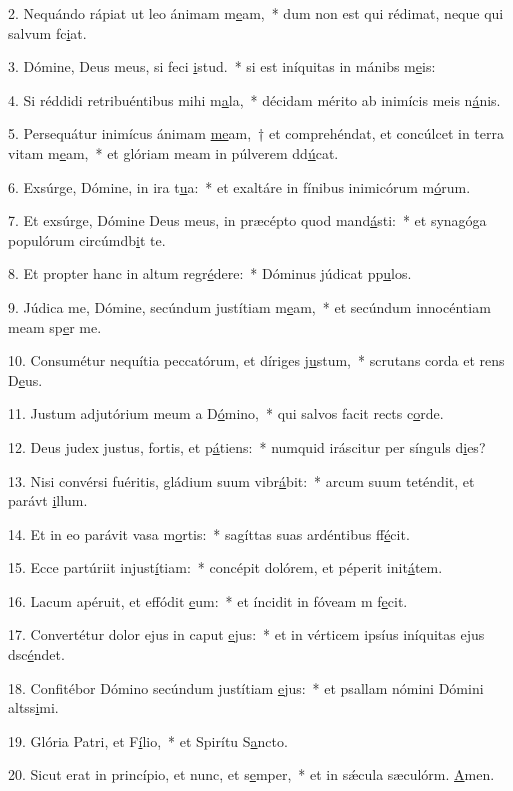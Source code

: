 2. Nequándo rápiat ut leo ánimam m\uline{e}am,~* dum non est qui rédimat, neque qui salvum fc\uline{i}at.\par 
3. Dómine, Deus meus, si feci \uline{i}stud.~* si est iníquitas in mánibs m\uline{e}is:\par 
4. Si réddidi retribuéntibus mihi m\uline{a}la,~* décidam mérito ab inimícis meis n\uline{á}nis.\par 
5. Persequátur inimícus ánimam \uline{me}am,~† et comprehéndat, et concúlcet in terra vitam m\uline{e}am,~* et glóriam meam in púlverem dd\uline{ú}cat.\par 
6. Exsúrge, Dómine, in ira t\uline{u}a:~* et exaltáre in fínibus inimicórum m\uline{ó}rum.\par 
7. Et exsúrge, Dómine Deus meus, in præcépto quod mand\uline{á}sti:~* et synagóga populórum circúmdb\uline{i}t te.\par 
8. Et propter hanc in altum regr\uline{é}dere:~* Dóminus júdicat pp\uline{u}los.\par 
9. Júdica me, Dómine, secúndum justítiam m\uline{e}am,~* et secúndum innocéntiam meam sp\uline{e}r me.\par 
10. Consumétur nequítia peccatórum, et díriges j\uline{u}stum,~* scrutans corda et rens D\uline{e}us.\par 
11. Justum adjutórium meum a D\uline{ó}mino,~* qui salvos facit rects c\uline{o}rde.\par 
12. Deus judex justus, fortis, et p\uline{á}tiens:~* numquid iráscitur per sínguls d\uline{i}es?\par 
13. Nisi convérsi fuéritis, gládium suum vibr\uline{á}bit:~* arcum suum teténdit, et parávt \uline{i}llum.\par 
14. Et in eo parávit vasa m\uline{o}rtis:~* sagíttas suas ardéntibus ff\uline{é}cit.\par 
15. Ecce partúriit injust\uline{í}tiam:~* concépit dolórem, et péperit init\uline{á}tem.\par 
16. Lacum apéruit, et effódit \uline{e}um:~* et íncidit in fóveam m f\uline{e}cit.\par 
17. Convertétur dolor ejus in caput \uline{e}jus:~* et in vérticem ipsíus iníquitas ejus dsc\uline{é}ndet.\par 
18. Confitébor Dómino secúndum justítiam \uline{e}jus:~* et psallam nómini Dómini altss\uline{i}mi.\par 
19. Glória Patri, et F\uline{í}lio,~* et Spirítu S\uline{a}ncto.\par 
20. Sicut erat in princípio, et nunc, et s\uline{e}mper,~* et in sǽcula sæculórm. \uline{A}men.\par 
